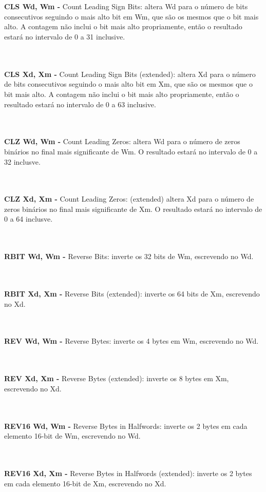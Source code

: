 \documentclass[12pt,a4paper,utf8]{ppgsi}
\begin{document}
\\\\\textbf{CLS Wd, Wm -} Count Leading Sign Bits: altera Wd para o número de bits consecutivos seguindo o mais alto bit em Wm, que são os mesmos que o bit mais alto. A contagem não inclui o bit mais alto propriamente, então o resultado estará no intervalo de 0 a 31 inclusive.

\\\\\textbf{CLS Xd, Xm -} Count Leading Sign Bits (extended): altera Xd para o número de bits consecutivos seguindo o mais alto bit em Xm, que são os mesmos que o bit mais alto. A contagem não inclui o bit mais alto propriamente, então o resultado estará no intervalo de 0 a 63 inclusive.

\\\\\textbf{CLZ Wd, Wm -} Count Leading Zeros: altera Wd para o número de zeros binários no final mais significante de Wm. O resultado estará no intervalo de 0 a 32 inclusve.

\\\\\textbf{CLZ Xd, Xm -} Count Leading Zeros: (extended) altera Xd para o número de zeros binários no final mais significante de Xm. O resultado estará no intervalo de 0 a 64 inclusve.

\\\\\textbf{RBIT Wd, Wm -} Reverse Bits: inverte os 32 bits de Wm, escrevendo no Wd. 

\\\\\textbf{RBIT Xd, Xm -} Reverse Bits (extended): inverte os 64 bits de Xm, escrevendo no Xd. 

\\\\\textbf{REV Wd, Wm -} Reverse Bytes: inverte os 4 bytes em Wm, escrevendo no Wd.

\\\\\textbf{REV Xd, Xm -} Reverse Bytes (extended): inverte os 8 bytes em Xm, escrevendo no Xd.

\\\\\textbf{REV16 Wd, Wm -} Reverse Bytes in Halfwords: inverte os 2 bytes em cada elemento 16-bit de Wm, escrevendo no Wd. 

\\\\\textbf{REV16 Xd, Xm -} Reverse Bytes in Halfwords (extended): inverte os 2 bytes em cada elemento 16-bit de Xm, escrevendo no Xd. 
\end{document}
